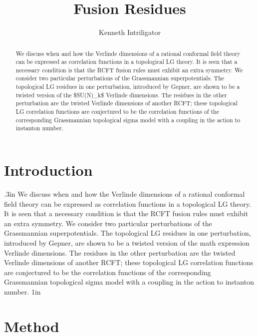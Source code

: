\documentclass[11pt]{article}
\title{Fusion Residues}
\author{Kenneth Intriligator}
\date{}
\begin{document}
\maketitle
\begin{abstract}

We discuss when and how the Verlinde dimensions of a rational conformal field theory can be expressed as correlation functions in a topological LG theory. It is seen that a necessary condition is that the RCFT fusion rules must exhibit an extra symmetry. We consider two particular perturbations of the Grassmannian superpotentials. The topological LG residues in one perturbation, introduced by Gepner, are shown to be a twisted version of the \$SU(N)\_k\$ Verlinde dimensions. The residues in the other perturbation are the twisted Verlinde dimensions of another RCFT; these topological LG correlation functions are conjectured to be the correlation functions of the corresponding Grassmannian topological sigma model with a coupling in the action to instanton number.

\end{abstract}

\section{Introduction}

.3in We discuss when and how the Verlinde dimensions of a rational conformal field theory can be expressed as correlation functions in a topological LG theory. It is seen that a necessary condition is that the RCFT fusion rules must exhibit an extra symmetry. We consider two particular perturbations of the Grassmannian superpotentials. The topological LG residues in one perturbation, introduced by Gepner, are shown to be a twisted version of the math expression Verlinde dimensions. The residues in the other perturbation are the twisted Verlinde dimensions of another RCFT; these topological LG correlation functions are conjectured to be the correlation functions of the corresponding Grassmannian topological sigma model with a coupling in the action to instanton number. 1in

\section{Method}
\end{document}
